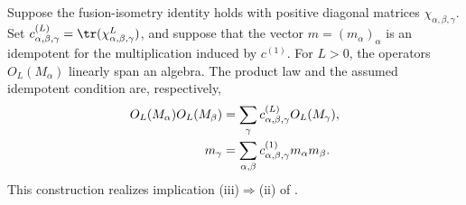 \begin{definition}%
    \label{def:mpdo_bnt_fusion_algebra_clause}
    \leanok
    Suppose the fusion-isometry identity holds with positive diagonal matrices
    $\chi_{\alpha,\beta,\gamma}$. Set
    $c^{(L)}_{\alpha,\beta,\gamma}
        =\tr(\chi_{\alpha,\beta,\gamma}^{L})$,
    and suppose that the vector $m=(m_\alpha)_\alpha$ is an idempotent for
    the multiplication induced by $c^{(1)}$.
    For $L>0$, the operators $O_L(M_\alpha)$ linearly span an algebra.
    The product law and the assumed idempotent condition are, respectively,
    \begin{align}
        O_L(M_\alpha)O_L(M_\beta)
         & =\sum_\gamma
        c^{(L)}_{\alpha,\beta,\gamma}O_L(M_\gamma),
        \notag                  \\
        m_\gamma
         & =\sum_{\alpha,\beta}
        c^{(1)}_{\alpha,\beta,\gamma}m_\alpha m_\beta.
        \notag
    \end{align}
    This construction realizes implication (iii)$\Rightarrow$(ii) of
    \cite[Theorem~4.14]{Cirac2016MPDO_arXiv}.
\end{definition}

